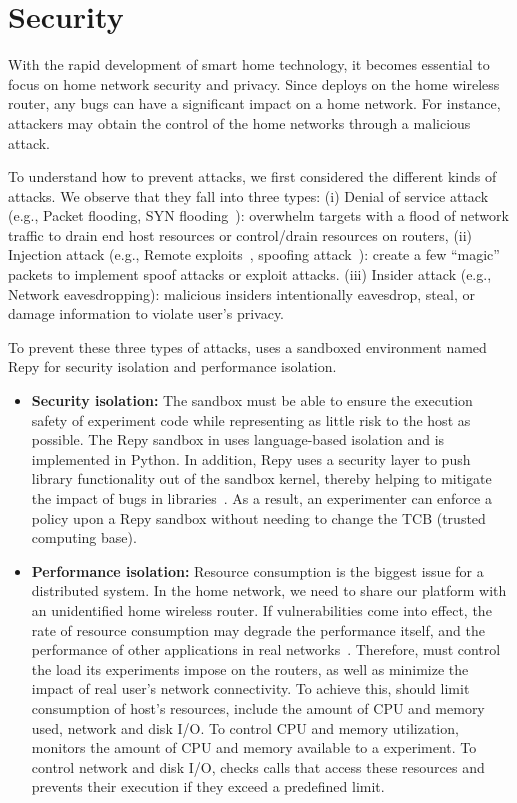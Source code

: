 \section{Security}
\label{sec.security}
With the rapid development of smart home technology, it becomes essential to focus on home network security and privacy. Since \sysname deploys on the home wireless router, any bugs can have a significant impact on a home network. For instance, attackers may obtain the control of the home networks through a malicious attack. 

To understand how to prevent attacks, we first considered the different kinds of attacks. We observe that they fall into three types: (i) Denial of service attack (e.g., Packet flooding, SYN flooding~\cite{eddy2011syn}): overwhelm targets with a flood of network traffic to drain end host resources or control/drain resources on routers, (ii) Injection attack (e.g., Remote exploits~\cite{shellcode},  spoofing attack~\cite{bishop1996attack}): create a few ``magic'' packets to implement spoof attacks or exploit attacks. (iii) Insider attack (e.g., Network eavesdropping): malicious insiders intentionally eavesdrop, steal, or damage information to violate user's privacy.

To prevent these three types of attacks, \sysname uses a sandboxed environment named Repy for security isolation and performance isolation.
 
\begin{itemize} 
\item \textbf{Security isolation:} The sandbox must be able to ensure the execution safety of experiment code while representing as little risk to the host as possible. The Repy sandbox in \sysname uses language-based isolation and is implemented in Python. In addition, Repy uses a security layer to push library functionality out of the sandbox kernel, thereby helping to mitigate the impact of bugs in libraries~\cite{cappos2010retaining}. As a result, an experimenter can enforce a policy upon a Repy sandbox without needing to change the TCB (trusted computing base).  
\item \textbf{Performance isolation:} Resource consumption is the biggest issue for a distributed system. In the home network, we need to share our platform with an unidentified home wireless router. If vulnerabilities come into effect\cite{joshi2013survey}, the rate of resource consumption may degrade the performance itself, and the performance of other applications in real networks~\cite{joshi2013survey}. Therefore, \sysname must control the load its experiments impose on the routers, as well as minimize the impact of real user's network connectivity. To achieve this, \sysname should limit consumption of host's resources, include the amount of CPU and memory used, network and disk I/O. To control CPU and memory utilization, \sysname monitors the amount of CPU and memory available to a experiment. To control network and disk I/O, \sysname checks calls that access these resources and prevents their execution if they exceed a predefined limit. 
\end{itemize}

